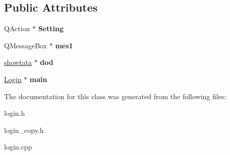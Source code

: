 \subsection*{Public Attributes}
\begin{DoxyCompactItemize}
\item 
\hypertarget{class_login_aeab33b7e36bd3e55c6a957290a74e221}{}\label{class_login_aeab33b7e36bd3e55c6a957290a74e221} 
Q\+Action $\ast$ {\bfseries Setting}
\item 
\hypertarget{class_login_a8c0727b99b15f38a77ab946fa3239801}{}\label{class_login_a8c0727b99b15f38a77ab946fa3239801} 
Q\+Message\+Box $\ast$ {\bfseries mes1}
\item 
\hypertarget{class_login_af88cd8be1e64096bdca27d016e60e719}{}\label{class_login_af88cd8be1e64096bdca27d016e60e719} 
\hyperlink{classshowtata}{showtata} $\ast$ {\bfseries dod}
\item 
\hypertarget{class_login_a7033035a95e1f9ab15f9ed9c2da9ceeb}{}\label{class_login_a7033035a95e1f9ab15f9ed9c2da9ceeb} 
\hyperlink{class_login}{Login} $\ast$ {\bfseries main}
\end{DoxyCompactItemize}


The documentation for this class was generated from the following files\+:\begin{DoxyCompactItemize}
\item 
login.\+h\item 
login\+\_\+copy.\+h\item 
login.\+cpp\end{DoxyCompactItemize}
